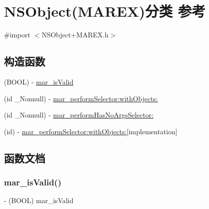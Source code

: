 \hypertarget{category_n_s_object_07_m_a_r_e_x_08}{}\section{N\+S\+Object(M\+A\+R\+EX)分类 参考}
\label{category_n_s_object_07_m_a_r_e_x_08}


{\ttfamily \#import $<$N\+S\+Object+\+M\+A\+R\+E\+X.\+h$>$}

\subsection*{构造函数}
\begin{DoxyCompactItemize}
\item 
(B\+O\+OL) -\/ \hyperlink{category_n_s_object_07_m_a_r_e_x_08_a486e1262196d066dcf402d490334540f}{mar\+\_\+is\+Valid}
\item 
(id \+\_\+\+Nonnull) -\/ \hyperlink{category_n_s_object_07_m_a_r_e_x_08_a35d3dc1d189064f214b53f14372f28aa}{mar\+\_\+perform\+Selector\+:with\+Objects\+:}
\item 
(id \+\_\+\+Nonnull) -\/ \hyperlink{category_n_s_object_07_m_a_r_e_x_08_ab18745281d51f78b7bb45eaab01cf667}{mar\+\_\+perform\+Has\+No\+Args\+Selector\+:}
\item 
(id) -\/ \hyperlink{category_n_s_object_07_m_a_r_e_x_08_ac7a7d5ae50da3fedd458d9abacfdfd25}{mar\+\_\+perform\+Selector\+:with\+Objects\+:}{\ttfamily  \mbox{[}implementation\mbox{]}}
\end{DoxyCompactItemize}


\subsection{函数文档}
\mbox{\label{category_n_s_object_07_m_a_r_e_x_08_a486e1262196d066dcf402d490334540f}} 
\subsubsection{\texorpdfstring{mar\+\_\+is\+Valid()}{mar\_isValid()}}
{\footnotesize\ttfamily -\/ (B\+O\+OL) mar\+\_\+is\+Valid \begin{DoxyParamCaption}{ }\end{DoxyParamCaption}}

